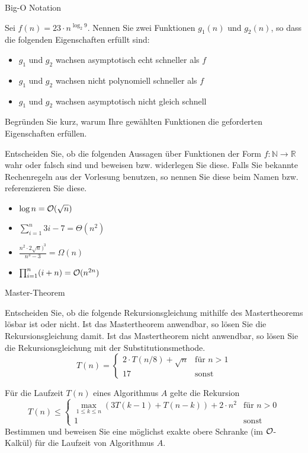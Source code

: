 \documentclass{article}
\begin{document}
\begin{exercises}{Big-O Notation}
\item Sei $f(n) = 23 \cdot n^{\log_2{9}}$. Nennen Sie zwei Funktionen $g_1(n)$ und $g_2(n)$, so dass die folgenden Eigenschaften erfüllt sind:
\begin{itemize}
  \item $g_1$ und $g_2$ wachsen asymptotisch echt schneller als $f$
  \item $g_1$ und $g_2$ wachsen nicht polynomiell schneller als $f$
  \item $g_1$ und $g_2$ wachsen asymptotisch nicht gleich schnell
\end{itemize}
Begründen Sie kurz, warum Ihre gewählten Funktionen die geforderten Eigenschaften erfüllen.
\item Entscheiden Sie, ob die folgenden Aussagen über Funktionen der Form $f: \mathbb{N} \to \mathbb{R}$ wahr oder falsch sind und beweisen bzw. widerlegen Sie diese. Falls Sie bekannte Rechenregeln aus der Vorlesung benutzen, so nennen Sie diese beim Namen bzw. referenzieren Sie diese.
\begin{itemize}
  \item $\log n = \mathcal{O}(\sqrt{n})$
  \item $\sum_{i=1}^n 3i - 7 = \Theta(n^2)$
  \item $\frac{n^2\cdot 2\sqrt{n})^3}{n^3-3} = \Omega(n) $
  \item $\prod_{i=1}^n (i + n) = \mathcal{O}(n^{2n})$
\end{itemize}
\end{exercises}

\begin{exercises}{Master-Theorem}
\item Entscheiden Sie, ob die folgende Rekursionsgleichung mithilfe des Mastertheorems lösbar ist oder nicht. Ist das Mastertheorem anwendbar, so lösen Sie die Rekursionsgleichung damit. Ist das Mastertheorem nicht anwendbar, so lösen Sie die Rekursionsgleichung mit der Substitutionsmethode.
\begin{equation*}
  T(n) = \begin{cases}
    2\cdot T(n/8)+\sqrt{n} & \text{für } n > 1 \\
    17                     & \text{sonst}
  \end{cases}
\end{equation*}
\item Für die Laufzeit $T(n)$ eines Algorithmus $A$ gelte die Rekursion
\begin{equation*}
  T(n) \leq \begin{cases}
    \max_{1\leq k\leq n}(3T(k-1)+T(n-k))+2\cdot n^2 & \text{für } n > 0 \\
    1                                               & \text{sonst}
  \end{cases}
\end{equation*}
Bestimmen und beweisen Sie eine möglichst exakte obere Schranke (im $\mathcal{O}$-Kalkül) für die Laufzeit von Algorithmus $A$.
\end{exercises}
\end{document}
